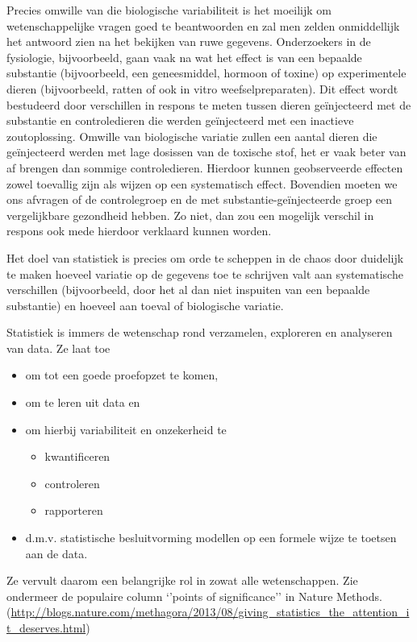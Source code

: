 \documentclass[
  12pt,dutch,coursenotes]{book}
\providecommand{\tightlist}{%
  \setlength{\itemsep}{0pt}\setlength{\parskip}{0pt}}
\theoremstyle{definition}
\theoremstyle{definition}
\theoremstyle{definition}
\theoremstyle{remark}
\begin{document}
Precies omwille van die biologische variabiliteit is het moeilijk om wetenschappelijke vragen goed te beantwoorden en zal men zelden onmiddellijk het antwoord zien na het bekijken van ruwe gegevens. Onderzoekers in de fysiologie, bijvoorbeeld, gaan vaak na wat het effect is van een bepaalde substantie (bijvoorbeeld, een geneesmiddel, hormoon of toxine) op experimentele dieren (bijvoorbeeld, ratten of ook in vitro weefselpreparaten). Dit effect wordt bestudeerd door verschillen in respons te meten tussen dieren geïnjecteerd met de substantie en controledieren die werden geïnjecteerd met een inactieve zoutoplossing. Omwille van biologische variatie zullen een aantal dieren die geïnjecteerd werden met lage dosissen van de toxische stof, het er vaak beter van af brengen dan sommige controledieren. Hierdoor kunnen geobserveerde effecten zowel toevallig zijn als wijzen op een systematisch effect. Bovendien moeten we ons afvragen of de controlegroep en de met substantie-geïnjecteerde groep een vergelijkbare gezondheid hebben. Zo niet, dan zou een mogelijk verschil in respons ook mede hierdoor verklaard kunnen worden.

Het doel van statistiek is precies om orde te scheppen in de chaos door duidelijk te maken hoeveel variatie op de gegevens toe te schrijven valt aan systematische verschillen (bijvoorbeeld, door het al dan niet inspuiten van een bepaalde substantie) en hoeveel aan toeval of biologische variatie.

Statistiek is immers de wetenschap rond verzamelen, exploreren en analyseren van data. Ze laat toe

\begin{itemize}
\tightlist
\item
  om tot een goede proefopzet te komen,
\item
  om te leren uit data en
\item
  om hierbij variabiliteit en onzekerheid te

  \begin{itemize}
  \tightlist
  \item
    kwantificeren
  \item
    controleren
  \item
    rapporteren
  \end{itemize}
\item
  d.m.v. statistische besluitvorming modellen op een formele wijze te toetsen aan de data.
\end{itemize}

Ze vervult daarom een belangrijke rol in zowat alle wetenschappen. Zie ondermeer de populaire column `'points of significance'' in Nature Methods. (\url{http://blogs.nature.com/methagora/2013/08/giving_statistics_the_attention_it_deserves.html})
\end{document}
